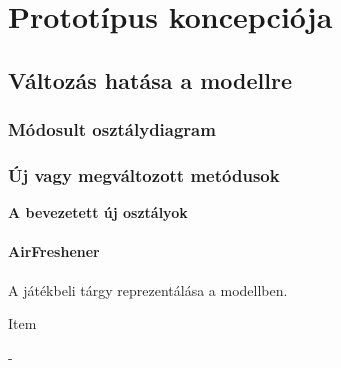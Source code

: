 \chapter{Prototípus koncepciója}
\setcounter{section}{-1}
\section{Változás hatása a modellre}
\subsection{Módosult osztálydiagram}


\clearpage

\subsection{Új vagy megváltozott metódusok}
\textbf{A bevezetett új osztályok}
\subsubsection{AirFreshener}
\begin{class-template-responsibility}
    A játékbeli tárgy reprezentálása a modellben.
\end{class-template-responsibility}
\begin{class-template-baseclass}
    Item
\end{class-template-baseclass}
\begin{class-template-method}
    -
\end{class-template-method}

